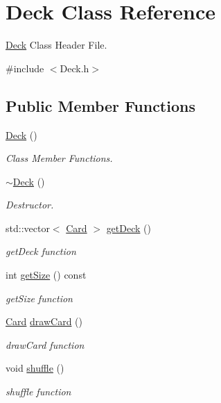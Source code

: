 \hypertarget{classDeck}{\section{Deck Class Reference}
\label{classDeck}
}


\hyperlink{classDeck}{Deck} Class Header File.  




{\ttfamily \#include $<$Deck.\-h$>$}

\subsection*{Public Member Functions}
\begin{DoxyCompactItemize}
\item 
\hyperlink{classDeck_a57ae1cb4ac6fd61c249cefb2db85eb99}{Deck} ()
\begin{DoxyCompactList}\small\item\em Class Member Functions. \end{DoxyCompactList}\item 
\hyperlink{classDeck_a7d1331cc558c302fdf44e5ae8aae1a95}{$\sim$\-Deck} ()
\begin{DoxyCompactList}\small\item\em Destructor. \end{DoxyCompactList}\item 
std\-::vector$<$ \hyperlink{classCard}{Card} $>$ \hyperlink{classDeck_adfe35fabd6057f11311b36ea9d208811}{get\-Deck} ()
\begin{DoxyCompactList}\small\item\em get\-Deck function \end{DoxyCompactList}\item 
int \hyperlink{classDeck_afb10885a5ed9ee890d73a655f4fa5d94}{get\-Size} () const 
\begin{DoxyCompactList}\small\item\em get\-Size function \end{DoxyCompactList}\item 
\hyperlink{classCard}{Card} \hyperlink{classDeck_a7e3cb5a726dec9953c564ab7d780563d}{draw\-Card} ()
\begin{DoxyCompactList}\small\item\em draw\-Card function \end{DoxyCompactList}\item 
void \hyperlink{classDeck_ae5a1e52ab00ae5924f2bc6b730dba3eb}{shuffle} ()
\begin{DoxyCompactList}\small\item\em shuffle function \end{DoxyCompactList}\end{DoxyCompactItemize}


